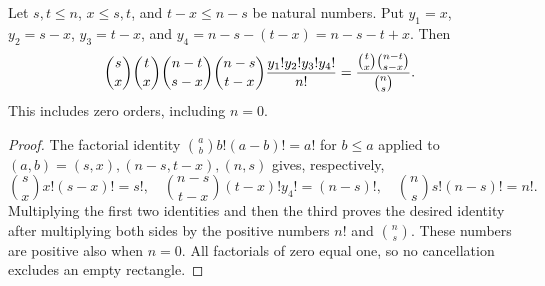 \begin{lemma}
Let $s,t\le n$, $x\le s,t$, and $t-x\le n-s$ be natural numbers.
Put $y_1=x$, $y_2=s-x$, $y_3=t-x$, and
$y_4=n-s-(t-x)=n-s-t+x$. Then
\[
 \binom s x\binom t x\binom{n-t}{s-x}\binom{n-s}{t-x}
 {y_1!y_2!y_3!y_4!\over n!}
 ={\binom t x\binom{n-t}{s-x}\over\binom n s}.
\]
This includes zero orders, including $n=0$.
\end{lemma}
\begin{proof}
The factorial identity $\binom a b b!(a-b)!=a!$ for $b\le a$
applied to $(a,b)=(s,x),(n-s,t-x),(n,s)$ gives, respectively,
\[
 \binom s x x!(s-x)!=s!,\quad
 \binom{n-s}{t-x}(t-x)!y_4!=(n-s)!,\quad
 \binom n s s!(n-s)!=n!.
\]
Multiplying the first two identities and then the third proves the desired
identity after multiplying both sides by the positive numbers $n!$ and
$\binom n s$. These numbers are positive also when $n=0$. All factorials
of zero equal one, so no cancellation excludes an empty rectangle.
\end{proof}
